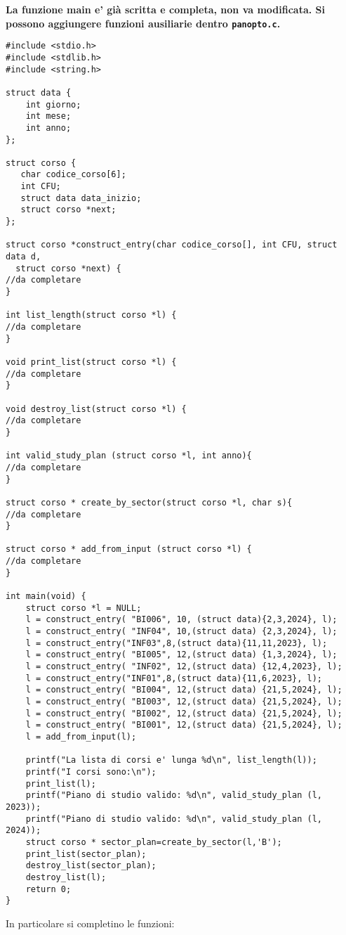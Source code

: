 \documentclass[12pt]{article}
\begin{document}
\begin{mdframed}[backgroundcolor=myLightBlue] 
  \vspace*{-0.5ex}
  \textbf{La funzione main e' gi\`a scritta e completa, non va modificata. Si possono aggiungere funzioni ausiliarie dentro \texttt{panopto.c}.}
\end{mdframed}
%
\begin{lstlisting}[language=myC]
#include <stdio.h>
#include <stdlib.h>
#include <string.h>

struct data {
	int giorno;
    int mese;
    int anno;
};

struct corso {
   char codice_corso[6];
   int CFU;
   struct data data_inizio;
   struct corso *next;
};

struct corso *construct_entry(char codice_corso[], int CFU, struct data d,
  struct corso *next) {
//da completare
}

int list_length(struct corso *l) {
//da completare
}

void print_list(struct corso *l) {
//da completare
}

void destroy_list(struct corso *l) {	
//da completare
}

int valid_study_plan (struct corso *l, int anno){
//da completare
}

struct corso * create_by_sector(struct corso *l, char s){
//da completare
}

struct corso * add_from_input (struct corso *l) {
//da completare	
}

int main(void) {
    struct corso *l = NULL;
    l = construct_entry( "BI006", 10, (struct data){2,3,2024}, l);
    l = construct_entry( "INF04", 10,(struct data) {2,3,2024}, l);
    l = construct_entry("INF03",8,(struct data){11,11,2023}, l);
    l = construct_entry( "BI005", 12,(struct data) {1,3,2024}, l);
    l = construct_entry( "INF02", 12,(struct data) {12,4,2023}, l);
    l = construct_entry("INF01",8,(struct data){11,6,2023}, l);
    l = construct_entry( "BI004", 12,(struct data) {21,5,2024}, l);
    l = construct_entry( "BI003", 12,(struct data) {21,5,2024}, l);
    l = construct_entry( "BI002", 12,(struct data) {21,5,2024}, l);
    l = construct_entry( "BI001", 12,(struct data) {21,5,2024}, l);
    l = add_from_input(l);
	 
    printf("La lista di corsi e' lunga %d\n", list_length(l));
    printf("I corsi sono:\n");
    print_list(l);
    printf("Piano di studio valido: %d\n", valid_study_plan (l, 2023));
    printf("Piano di studio valido: %d\n", valid_study_plan (l, 2024));
    struct corso * sector_plan=create_by_sector(l,'B');
    print_list(sector_plan);
    destroy_list(sector_plan);
    destroy_list(l);
    return 0;
}
\end{lstlisting}
In particolare si completino le funzioni:
\end{document}
